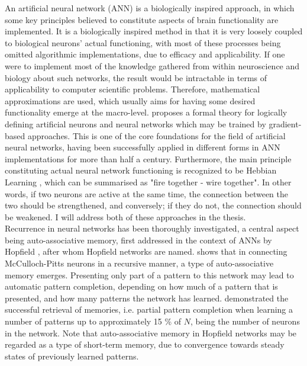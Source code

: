 An artificial neural network (ANN) is a biologically inspired approach, in which some key principles believed to constitute aspects of brain functionality are implemented. It is a biologically inspired method in that it is very loosely coupled to biological neurons' actual functioning, with most of these processes being omitted algorithmic implementations, due to efficacy and applicability. If one were to implement most of the knowledge gathered from within neuroscience and biology about such networks, the result would be intractable in terms of applicability to computer scientific problems. Therefore, mathematical approximations are used, which usually aims for having some desired functionality emerge at the macro-level. \citet{McCulloch1943} proposes a formal theory for logically defining artificial neurons and neural networks which may be trained by gradient-based approaches. This is one of the core foundations for the field of artificial neural networks, having been successfully applied in different forms in ANN implementations for more than half a century.
Furthermore, the main principle constituting actual neural network functioning is recognized to be Hebbian Learning \citep{Hebb1949}, which can be summarised as "fire together - wire together". In other words, if two neurons are active at the same time, the connection between the two should be strengthened, and conversely; if they do not, the connection should be weakened.
I will address both of these approaches in the thesis.
\\

Recurrence in neural networks has been thoroughly investigated, a central aspect being auto-associative memory, first addressed in the context of ANNs by Hopfield \citep{Hopfield1982}, after whom Hopfield networks are named. \citet{Hopfield1982} shows that in connecting McCulloch-Pitts neurons \citep{McCulloch1943} in a recursive manner, a type of auto-associative memory emerges. Presenting only part of a pattern to this network may lead to automatic pattern completion, depending on how much of a pattern that is presented, and how many patterns the network has learned. \citet{Hopfield1982} demonstrated the successful retrieval of memories, i.e. partial pattern completion when learning a number of patterns up to approximately 15 \% of $N$, being the number of neurons in the network. Note that auto-associative memory in Hopfield networks may be regarded as a type of short-term memory, due to convergence towards steady states of previously learned patterns.

